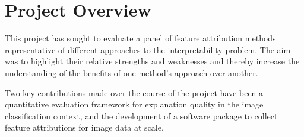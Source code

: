 \documentclass[main]{subfiles}
\begin{document}




\section{Project Overview}
This project has sought to evaluate a panel of feature attribution methods representative of different approaches to the interpretability problem. The aim was to highlight their relative strengths and weaknesses and thereby increase the understanding of the benefits of one method's approach over another.

Two key contributions made over the course of the project have been a quantitative evaluation framework for explanation quality in the image classification context, and the development of a software package to collect feature attributions for image data at scale.
\end{document}
